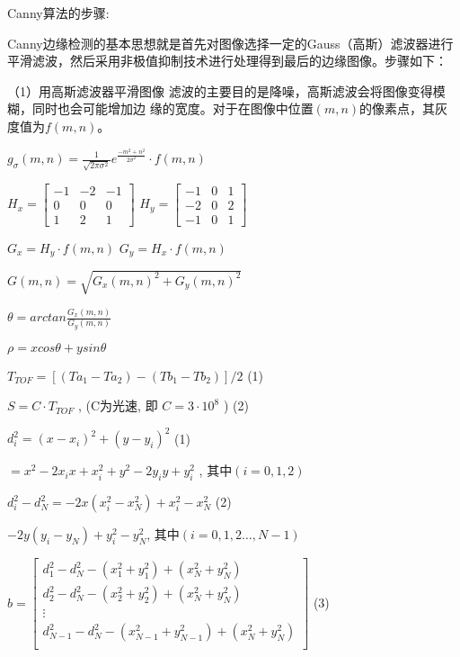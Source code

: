 Canny算法的步骤:

Canny边缘检测的基本思想就是首先对图像选择一定的Gauss（高斯）滤波器进行平滑滤波，然后采用非极值抑制技术进行处理得到最后的边缘图像。步骤如下：

（1）用高斯滤波器平滑图像
滤波的主要目的是降噪，高斯滤波会将图像变得模糊，同时也会可能增加边
缘的宽度。对于在图像中位置$(m,n)$的像素点，其灰度值为$f(m,n)$。

\bf{$g_{\sigma}(m,n) = \frac{1}{\sqrt{2\pi\sigma^2}} e^{\frac{-m^2+n^2}{2{\sigma^2}}} \cdot f(m,n) $}


$H_x = \begin{bmatrix} -1 & -2 & -1 \\ 0 & 0 & 0  \\ 1 & 2 & 1\end{bmatrix}$ \quad{}
$H_y = \begin{bmatrix} -1 & 0 & 1 \\ -2 & 0 & 2  \\ -1 & 0 & 1\end{bmatrix}$

$ G_x = H_y \cdot f(m,n)$ \quad{} $ G_y = H_x \cdot f(m,n)$


$G(m,n) = \sqrt{G_x(m,n) ^2 + G_y(m,n)^2}$

$\theta = arctan \frac{G_x(m,n)}{G_y(m,n)} $

\quad{}

$\rho = xcos \theta +ysin \theta$

\quad{}

$T_{TOF} =[(Ta_1 - Ta_2) - (Tb_1 - Tb_2)] /2 $ \quad{}\quad{}(1)

\quad{}

$ S= C \cdot T_{TOF}$ , \quad{}(C为光速, 即 $C=3\cdot 10^8$ ) \quad{}\quad{}(2)

\quad{}

$d_i^2 = (x - x_i)^2 + (y - y_i)^2 $ \quad{}\quad{}(1)

\quad$ = x^2 -2x_ix + x_i^2 + y^2 - 2y_iy + y_i^2$ , \quad{}其中$(i = 0,1,2)$

\quad

$d_i^2 - d_N^2 = -2x(x_i^2 - x_N^2) + x_i^2 -x_N^2 $ \quad{}\quad{}(2)

\quad\quad\quad\quad{} $- 2y(y_i-y_N) + y_i^2 - y_N^2$, \quad{}其中$(i = 0,1,2\dots, N-1)$

\quad{}

$b = \begin{bmatrix} d_1^2 - d_N^2 - (x_1^2 + y_1^2) + (x_N^2 + y_N^2) \\ d_2^2 - d_N^2 - (x_2^2 + y_2^2) + (x_N^2 + y_N^2) \\ \vdots \\d_{N-1}^2 - d_N^2 - (x_{N-1}^2 + y_{N-1}^2) + (x_N^2 + y_N^2) \\\end{bmatrix}$ \quad{}\quad{}(3)

